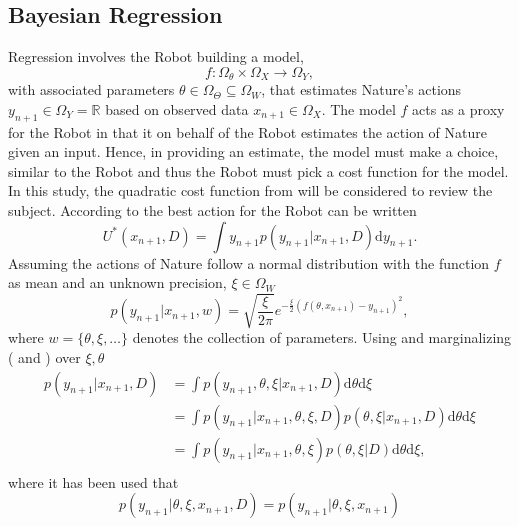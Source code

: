 \subsection{Bayesian Regression}
\label{chp:regression}
Regression involves the Robot building a model,
\begin{equation}
	f: \Omega_\theta\times \Omega_X\to\Omega_Y,
\end{equation} 
with associated parameters $\theta\in \Omega_\Theta\subseteq\Omega_W$, that estimates Nature's actions $y_{n+1}\in \Omega_Y=\mathbb{R}$ based on observed data $x_{n+1}\in \Omega_X$. The model $f$ acts as a proxy for the Robot in that it on behalf of the Robot estimates the action of Nature given an input. Hence, in providing an estimate, the model must make a choice, similar to the Robot and thus the Robot must pick a cost function for the model. In this study, the quadratic cost function from  will be considered to review the subject. According to  the best action for the Robot can be written
\begin{equation}
	U^*(x_{n+1},D) = \int y_{n+1} p(y_{n+1}|x_{n+1},D) \mathrm{d}y_{n+1}.
	\label{eq:q1}
\end{equation}
Assuming the actions of Nature follow a normal distribution with the function $f$ as mean and an unknown precision, $\xi\in \Omega_W$
\begin{equation}
	p(y_{n+1}|x_{n+1},w)=\sqrt{\frac{\xi}{2\pi}} e^{-\frac{\xi}{2}(f(\theta,x_{n+1})-y_{n+1})^2},
	\label{f_dist}
\end{equation}
where $w = \{\theta, \xi,\dots\}$ denotes the collection of parameters. Using  and marginalizing ( and ) over $\xi,\theta$
\begin{equation}
	\begin{split}
		p(y_{n+1}|x_{n+1},D) &= \int  p(y_{n+1},\theta,\xi|x_{n+1},D) \mathrm{d}\theta \mathrm{d}\xi\\
		& = \int  p(y_{n+1}|x_{n+1},\theta,\xi,D)  p(\theta,\xi|x_{n+1},D)\mathrm{d}\theta \mathrm{d}\xi\\
		& = \int  p(y_{n+1}|x_{n+1},\theta,\xi)  p(\theta,\xi|D) \mathrm{d}\theta \mathrm{d}\xi,\\
	\end{split}
	\label{eq:q2}
\end{equation}
where it has been used that 
\begin{equation}
	p(y_{n+1}|\theta,\xi,x_{n+1},D) = p(y_{n+1}|\theta,\xi,x_{n+1})
\end{equation}
